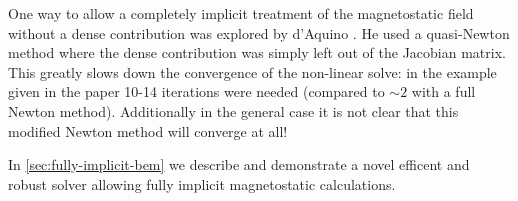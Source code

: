 One way to allow a completely implicit treatment of the magnetostatic field without a dense contribution was explored by d'Aquino \cite{DAquino2005}.
He used a quasi-Newton method where the dense contribution was simply left out of the Jacobian matrix.
This greatly slows down the convergence of the non-linear solve: in the example given in the paper 10-14 iterations were needed (compared to $\sim2$ with a full Newton method).
Additionally in the general case it is not clear that this modified Newton method will converge at all!

In \cref{sec:fully-implicit-bem} we describe and demonstrate a novel efficent and robust solver allowing fully implicit magnetostatic calculations.








